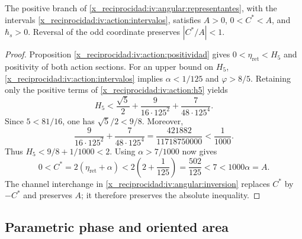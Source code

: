 \begin{proposition}
\label{x_reciprocidad:iv:ellipse:pertenencia}
The positive branch of \eqref{x_reciprocidad:iv:angular:representantes}, with the
intervals \eqref{x_reciprocidad:iv:action:intervalos}, satisfies
\(A>0\), \(0<C^*<A\), and \(\hbar_s>0\).
Reversal of the odd coordinate preserves \(|C^*/A|<1\).
\end{proposition}
\begin{proof}
Proposition \ref{x_reciprocidad:iv:action:positividad} gives
\(0<\eta_{\mathrm{ret}}<H_5\) and positivity of both
action sections. For an upper bound on \(H_5\),
\eqref{x_reciprocidad:iv:action:intervalos} implies
\(\alpha<1/125\) and \(\varphi>8/5\). Retaining only
the positive terms of \eqref{x_reciprocidad:iv:action:h5} yields
\[
 H_5<
 \frac{\sqrt5}{2}+
 \frac{9}{16\cdot125^2}+
 \frac{7}{48\cdot125^4}.
\]
Since \(5<81/16\), one has \(\sqrt5/2<9/8\). Moreover,
\[
 \frac{9}{16\cdot125^2}+
 \frac{7}{48\cdot125^4}
 =\frac{421882}{11718750000}<\frac1{1000}.
\]
Thus \(H_5<9/8+1/1000<2\). Using
\(\alpha>7/1000\) now gives
\[
 0<C^*=2(\eta_{\mathrm{ret}}+\alpha)
 <2\left(2+\frac1{125}\right)=\frac{502}{125}
 <7<1000\alpha=A.
\]
The channel interchange in
\ref{x_reciprocidad:iv:angular:inversion} replaces \(C^*\) by \(-C^*\)
and preserves \(A\); it therefore preserves the absolute inequality.
\end{proof}

\subsection{Parametric phase and oriented area}
\label{x_reciprocidad:iv:ellipse:area}

